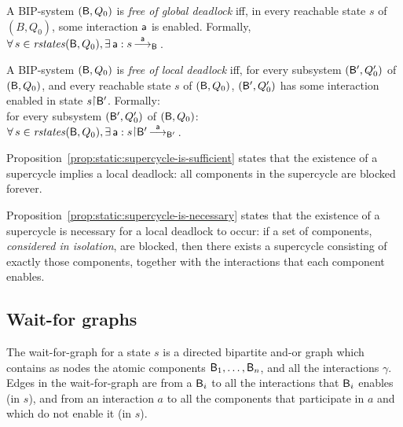 

\label{def:static:deadlock-free}
\label{def:global.deadlock-free}
A BIP-system $(\mathsf{B}, Q_0)$ is \emph{free of global deadlock} iff,
in every reachable state $s$ of $(B, Q_0)$, some interaction $\mathsf{a}$ is enabled.
Formally, $\forall\, s \in \mathit{rstates}(\mathsf{B},Q_0), \exists\, \mathsf{a} : s \mbox{$\, \stackrel{\mathsf{a}}{\longrightarrow}_{\mathsf{B}} \,$}$.
\ed


\label{def:local.deadlock-free}
A BIP-system $(\mathsf{B}, Q_0)$ is \emph{free of local deadlock} iff, 
for every subsystem $(\mathsf{B}', Q'_0)$ of  $(\mathsf{B}, Q_0)$, and every reachable state $s$ of $(\mathsf{B}, Q_0)$,
$(\mathsf{B}', Q'_0)$ has some interaction enabled in state $s \pj \B'$.
Formally:\\
\ind for every subsystem $(\mathsf{B}', Q'_0)$ of  $(\mathsf{B}, Q_0)$:\\
\ind \ind $\fa s \in \rstates{\B,Q_0},  \ex \act : s \pj \B' \enb{\act}{\B'}$.
\ed


Proposition~\ref{prop:static:supercycle-is-sufficient} states that the
existence of a supercycle implies a local deadlock: all components in
the supercycle are blocked forever.

Proposition~\ref{prop:static:supercycle-is-necessary} states that the
existence of a supercycle is necessary for a local deadlock to occur:
if a set of components, \emph{considered in isolation}, are blocked,
then there exists a supercycle consisting of exactly those components,
together with the interactions that each component enables.




\subsection{Wait-for graphs}

The wait-for-graph for a state $s$ is a directed bipartite and-or
graph which contains as nodes the atomic components $\mathsf{B}_1, \ldots,
\mathsf{B}_n$, and all the interactions $\gamma$.  Edges in the wait-for-graph
are from a $\mathsf{B}_i$ to all the interactions that $\mathsf{B}_i$ enables (in $s$),
and from an interaction $a$ to all the components that participate in
$a$ and which do not enable it (in $s$).


